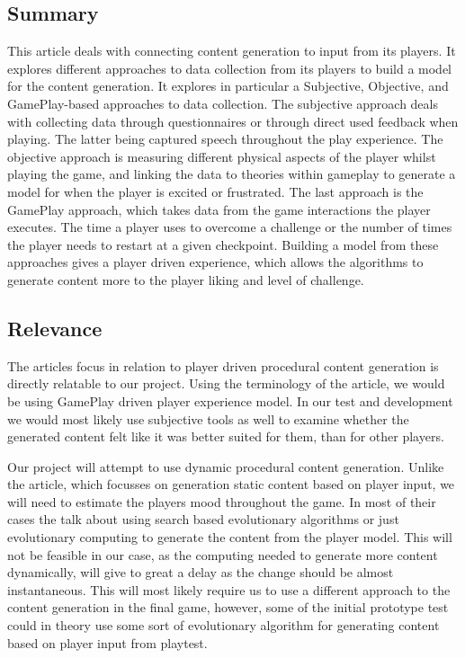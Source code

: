 \documentclass[a4paper,11pt]{article}
\begin{document}
\subsection{Summary}
This article\cite{experience} deals with connecting content generation to input from its players. It explores different approaches to data collection from its players to build a model for the content generation.
It explores in particular a Subjective, Objective, and GamePlay-based approaches to data collection. 
The subjective approach deals with collecting data through questionnaires or through direct used feedback when playing. The latter being captured speech throughout the play experience.
The objective approach is measuring different physical aspects of the player whilst playing the game, and linking the data to theories within gameplay to generate a model for when the player is excited or frustrated.
The last approach is the GamePlay approach, which takes data from the game interactions the player executes. The time a player uses to overcome a challenge or the number of times the player needs to restart at a given checkpoint.
Building a model from these approaches gives a player driven experience, which allows the algorithms to generate content more to the player liking and level of challenge. 
\subsection{Relevance}
The articles focus in relation to player driven procedural content generation is directly relatable to our project. Using the terminology of the article, we would be using GamePlay driven player experience model. In our test and development we would most likely use subjective tools as well to examine whether the generated content felt like it was better suited for them, than for other players. 

Our project will attempt to use dynamic procedural content generation. Unlike the article, which focusses on generation static content based on player input, we will need to estimate the players mood throughout the game. In most of their cases the talk about using search based evolutionary algorithms or just evolutionary computing to generate the content from the player model. This will not be feasible in our case, as the computing needed to generate more content dynamically, will give to great a delay as the change should be almost instantaneous. 
This will most likely require us to use a different approach to the content generation in the final game, however, some of the initial prototype test could in theory use some sort of evolutionary algorithm for generating content based on player input from playtest. 
\pagebreak
\end{document}
